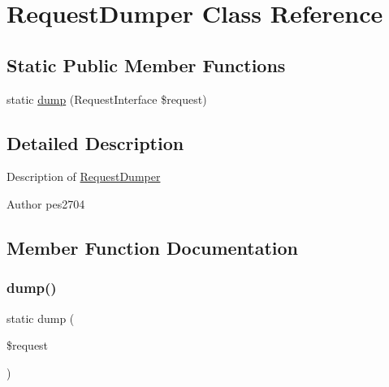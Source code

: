 \hypertarget{class_pes_1_1_http_1_1_helper_1_1_request_dumper}{}\section{Request\+Dumper Class Reference}
\label{class_pes_1_1_http_1_1_helper_1_1_request_dumper}
\subsection*{Static Public Member Functions}
\begin{DoxyCompactItemize}
\item 
static \mbox{\hyperlink{class_pes_1_1_http_1_1_helper_1_1_request_dumper_ac7ef7d7f7c16c285c4f4dcea58cd0e63}{dump}} (Request\+Interface \$request)
\end{DoxyCompactItemize}


\subsection{Detailed Description}
Description of \mbox{\hyperlink{class_pes_1_1_http_1_1_helper_1_1_request_dumper}{Request\+Dumper}}

\begin{DoxyAuthor}{Author}
pes2704 
\end{DoxyAuthor}


\subsection{Member Function Documentation}
\mbox{\label{class_pes_1_1_http_1_1_helper_1_1_request_dumper_ac7ef7d7f7c16c285c4f4dcea58cd0e63}} 
\subsubsection{\texorpdfstring{dump()}{dump()}}
{\footnotesize\ttfamily static dump (\begin{DoxyParamCaption}\item[{Request\+Interface}]{\$request }\end{DoxyParamCaption})\hspace{0.3cm}{\ttfamily [static]}}

